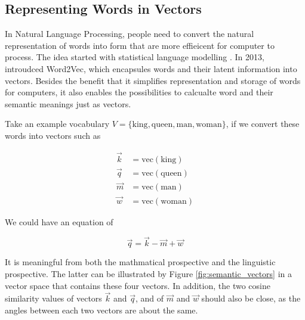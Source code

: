 \documentclass[thesis,fonts=libertine]{cluu}
\begin{document}
\subsection{Representing Words in Vectors}

In Natural Language Processing, people need to convert the natural representation of words into form that are more effieicent for computer to process. The idea started with statistical language modelling \parencite{bengio2003neural}. In 2013, \cite{Mikolov:2013aa} introudced Word2Vec, which encapsules words and their latent information into vectors. Besides the benefit that it simplifies representation and storage of words for computers, it also enables the possibilities to calcualte word and their semantic meanings just as vectors.

Take an example vocabulary $V=\{\text{king}, \text{queen}, \text{man}, \text{woman}\}$, if we convert these words into vectors such as 

\begin{align*}
  \vec{k} &= \text{vec}(\text{king})\\
  \vec{q} &= \text{vec}(\text{queen})\\
  \vec{m} &= \text{vec}(\text{man})\\
  \vec{w} &= \text{vec}(\text{woman})
\end{align*}

We could have an equation of 

\begin{equation}
  \label{equa:semantic_vectors}
  \vec{q}=\vec{k}-\vec{m}+\vec{w}
\end{equation}

It is meaningful from both the mathmatical prospective and the linguistic prospective. The latter can be illustrated by Figure \ref{fig:semantic_vectors} in a vector space that contains these four vectors. In addition, the two cosine similarity values of vectors $\vec{k}$ and $\vec{q}$, and of $\vec{m}$ and $\vec{w}$ should also be close, as the angles between each two vectors are about the same.
\end{document}
